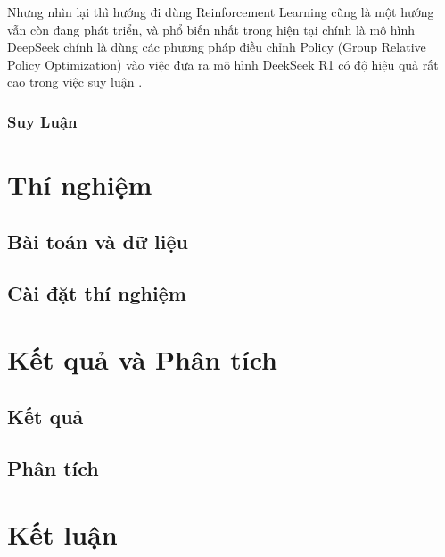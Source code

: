 \documentclass{article}
\begin{document}
Nhưng nhìn lại thì hướng đi dùng Reinforcement Learning cũng là một hướng vẫn còn đang phát triển, và phổ biến nhất trong hiện tại chính là mô hình DeepSeek chính là dùng các phương pháp điều chỉnh Policy (Group Relative Policy Optimization) vào việc đưa ra mô hình DeekSeek R1 có độ hiệu quả rất cao trong việc suy luận \cite{guo2025deepseek}. 

\subsubsection{Suy Luận}


\section{Thí nghiệm}

\subsection{Bài toán và dữ liệu}

\subsection{Cài đặt thí nghiệm}

\section{Kết quả và Phân tích} \label{sec:ketqua}

\subsection{Kết quả}

\subsection{Phân tích}

\section{Kết luận}


\printbibliography
\end{document}
